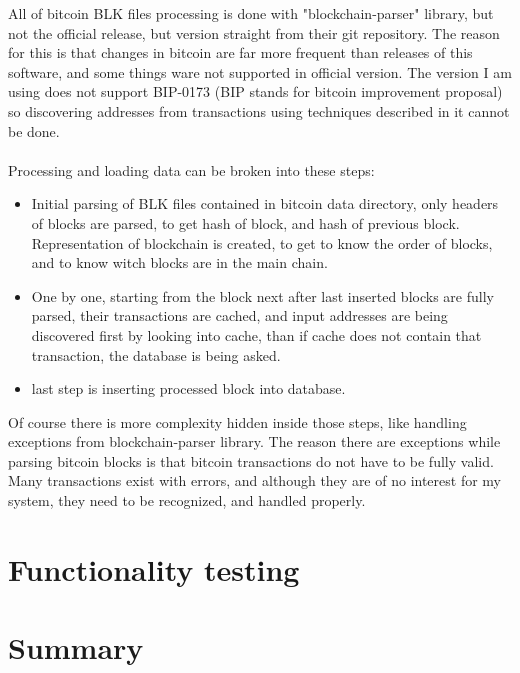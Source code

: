 \documentclass[12pt, en, eng]{mgr}
\begin{document}
All of bitcoin BLK files processing is done with "blockchain-parser" library, but not the official release, but version straight from their git repository. The reason for this is that changes in bitcoin are far more frequent than releases of this software, and some things ware not supported in official version. The version I am using does not support BIP-0173 (BIP stands for bitcoin improvement proposal) so discovering addresses from transactions using techniques described in it cannot be done. 
\\
\\
Processing and loading data can be broken into these steps:
\begin{itemize}
\item
Initial parsing of BLK files contained in bitcoin data directory, only headers of blocks are parsed, to get hash of block, and hash of previous block.
\itme
Representation of blockchain is created, to get to know the order of blocks, and to know witch blocks are in the main chain.
\item
One by one, starting from the block next after last inserted blocks are fully parsed, their transactions are cached, and input addresses are being discovered first by looking into cache, than if cache does not contain that transaction, the database is being asked.
\item
last step is inserting processed block into database.
\end{itemize}

Of course there is more complexity hidden inside those steps, like handling exceptions from blockchain-parser library. The reason there are exceptions while parsing bitcoin blocks is that bitcoin transactions do not have to be fully valid. Many transactions exist with errors, and although they are of no interest for my system, they need to be recognized, and handled properly.




\section{Functionality testing}

\section{Summary}
\end{document}
